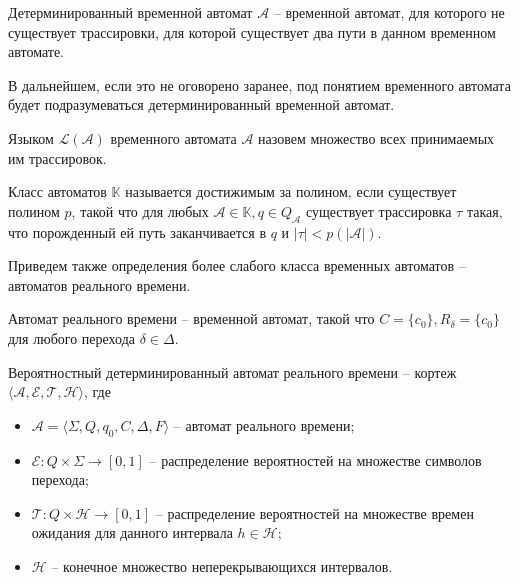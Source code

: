 \documentclass[times,specification,annotation]{itmo-student-thesis}
\begin{document}
\begin{definition}
  Детерминированный временной автомат $\mathcal{A}$ -- временной автомат, для которого не существует трассировки, для которой существует два пути в данном временном автомате.
  \label{DTA}
\end{definition}

В дальнейшем, если это не оговорено заранее, под понятием временного автомата будет подразумеваться детерминированный временной автомат.

\begin{definition}
  Языком $\mathcal{L}(\mathcal{A})$ временного автомата $\mathcal{A}$ назовем множество всех принимаемых им трассировок.
\end{definition}

\begin{definition}
  Класс автоматов $\mathbb{K}$ называется достижимым за полином, если существует полином $p$, такой что для любых
  $\mathcal{A} \in \mathbb{K}, q \in Q_{\mathcal{A}}$ существует трассировка $\tau$ такая, что порожденный ей путь заканчивается в $q$ и $|\tau| < p(|\mathcal{A}|)$.
\end{definition}

Приведем также определения более слабого класса временных автоматов -- автоматов реального времени.

\begin{definition}
  Автомат реального времени -- временной автомат, такой что $C = \{c_0\}, R_{\delta} = \{c_0\}$ для любого перехода $\delta \in \Delta$.
  \label{rti}
\end{definition}

\begin{definition}
  Вероятностный детерминированный автомат реального времени -- кортеж $\langle \mathcal{A}, \mathcal{E}, \mathcal{T}, \mathcal{H} \rangle$, где
  \begin{itemize}
    \item $\mathcal{A} = \langle \Sigma, Q, q_0, C, \Delta, F \rangle$ -- автомат реального времени;
    \item $\mathcal{E}: Q \times \Sigma \rightarrow [0, 1]$ -- распределение вероятностей на множестве символов перехода;
    \item $\mathcal{T}: Q \times \mathcal{H} \rightarrow [0, 1]$ -- распределение вероятностей на множестве времен ожидания для данного интервала $h \in \mathcal{H}$;
    \item $\mathcal{H}$ -- конечное множество неперекрывающихся интервалов.
  \end{itemize}
  \label{rti++}
\end{definition}
\end{document}
